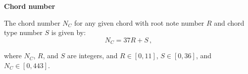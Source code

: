 \documentclass{letter}
\begin{document}
	
	\begin{center}
		\textbf{Chord number}
	\end{center}
	
	The chord number $N_C$ for any given chord with root note number $R$ and chord type number $S$ is given by:
	\begin{equation*}
		N_C = 37R + S \,,
	\end{equation*}
	
	where $N_C$, $R$, and $S$ are integers, and $R \in [0, 11]$, $S \in [0, 36]$, and $N_C \in [0, 443]$.\\
	
\end{document}
